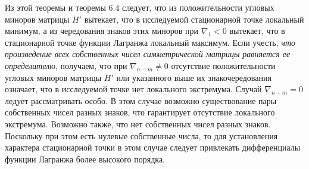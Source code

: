 
Из этой теоремы и теоремы $6.4$ следует, что из положительности угловых миноров матрицы $H'$ вытекает, что в исследуемой стационарной точке локальный минимум, а из чередования знаков этих миноров при $\nabla_1 < 0$ вытекает, что в стационарной точке функции Лагранжа локальный максимум. Если учесть, \textit{что произведение всех собственных чисел симметрической матрицы равняется ее определителю}, получаем, что при $\nabla_{n-m}\not=0$ отсутствие положительности угловых миноров матрицы  $H'$ или указанного выше их знакочередования означает, что в исследуемой точке нет локального экстремума. Случай $\nabla_{n-m}=0$ ледует рассматривать особо. В этом случае возможно существование пары собственных чисел разных знаков, что гарантирует отсутствие локального экстремума. Возможно также, что нет собственных чисел разных знаков. Поскольку при этом есть нулевые собственные числа, то для установления характера стационарной точки в этом случае следует привлекать дифференциалы функции Лагранжа более высокого порядка.

